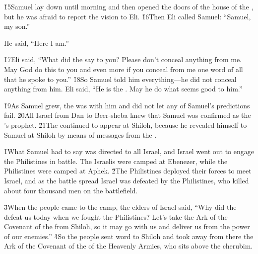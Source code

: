 \v{15}Samuel lay down until morning and then opened the doors of the house of the , but he was afraid to report the vision to Eli. \v{16}Then Eli called Samuel: ``Samuel, my son.''

He said, ``Here I am.''

\v{17}Eli said, ``What did the  say to you? Please don't conceal anything from me. May God do this to you and even more if you conceal from me one word of all that he spoke to you.'' \v{18}So Samuel told him everything---he did not conceal anything from him. Eli said, ``He is the . May he do what seems good to him.''

\v{19}As Samuel grew, the  was with him and did not let any of Samuel's predictions fail. \v{20}All Israel from Dan to Beer-sheba knew that Samuel was confirmed as the 's prophet. \v{21}The  continued to appear at Shiloh, because he revealed himself to Samuel at Shiloh by means of messages from the .

\v{1}What Samuel had to say was directed to all Israel, and Israel went out to engage the Philistines in battle. The Israelis were camped at Ebenezer, while the Philistines were camped at Aphek. \v{2}The Philistines deployed their forces to meet Israel, and as the battle spread Israel was defeated by the Philistines, who killed about four thousand men on the battlefield.

\v{3}When the people came to the camp, the elders of Israel said, ``Why did the  defeat us today when we fought the Philistines? Let's take the Ark of the Covenant of the  from Shiloh, so it may go with us and deliver us from the power of our enemies.'' \v{4}So the people sent word to Shiloh and took away from there the Ark of the Covenant of the  of the Heavenly Armies, who sits above the cherubim.

